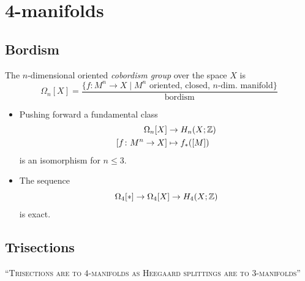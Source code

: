 \chapter{4-manifolds}

\section{Bordism}

\begin{definition}
	The $n$-dimensional oriented \textit{cobordism group}
	over the space $X$ is
	\begin{equation*}
		\Omega_{n}[X] =
			\frac{ \{ f \colon M^{n} \rightarrow X \mid M^n \textrm{ oriented, closed, } 
			n\textrm{-dim. manifold} \}}{\textrm{bordism}}
	\end{equation*}
\end{definition}

\begin{proposition}
	\begin{itemize}
		\item Pushing forward a fundamental class
		\begin{align*}
			\Omega_n [X] & \rightarrow H_{n}(X ; \mathbb{Z}) \\ 
			[f \colon M^{n} \rightarrow X] & \mapsto f_{*}([M])
		\end{align*}
		is an isomorphism for $n \le 3$.
		
		\item The sequence
		\begin{equation*}
			\Omega_{4}[\ast] \rightarrow \Omega_{4}[X] \rightarrow H_{4}(X ; \mathbb{Z})
		\end{equation*}
		is exact.
	\end{itemize}
\end{proposition}



\section{Trisections}

\begin{fullwidth}
	\textsc{``Trisections are to $4$-manifolds as Heegaard splittings are to
		$3$-manifolds''}
\end{fullwidth}

